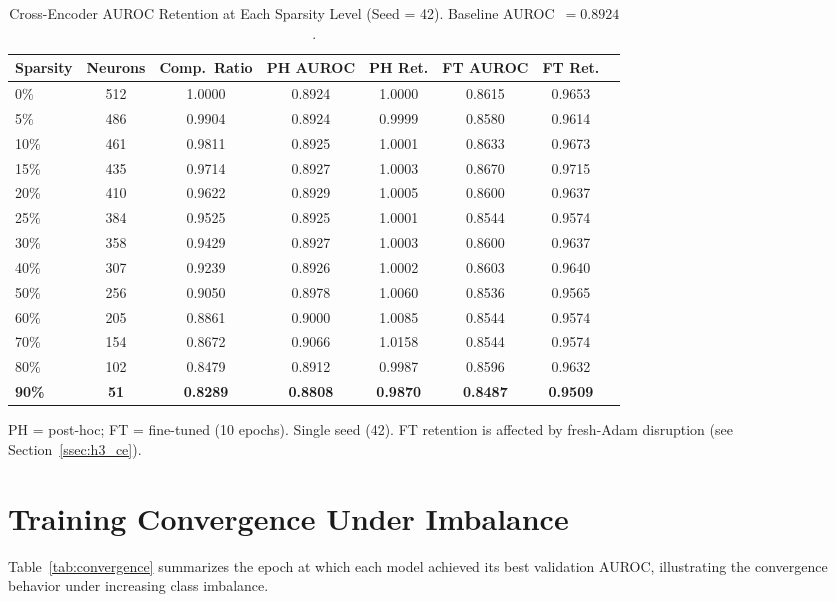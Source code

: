 \documentclass[journal]{IEEEtran}
\begin{document}
\begin{table}[!t]
  \caption{Cross-Encoder AUROC Retention at Each Sparsity Level (Seed = 42).
    Baseline AUROC~$= 0.8924$.}
  \label{tab:ce_pruning_full}
  \centering
  \small
  \begin{tabular}{lccccccc}
    \hline
    Sparsity & Neurons & Comp.\ Ratio & PH AUROC & PH Ret. & FT AUROC & FT Ret. \\
    \hline
    0\%           & 512 & 1.0000 & 0.8924 & 1.0000 & 0.8615 & 0.9653 \\
    5\%           & 486 & 0.9904 & 0.8924 & 0.9999 & 0.8580 & 0.9614 \\
    10\%          & 461 & 0.9811 & 0.8925 & 1.0001 & 0.8633 & 0.9673 \\
    15\%          & 435 & 0.9714 & 0.8927 & 1.0003 & 0.8670 & 0.9715 \\
    20\%          & 410 & 0.9622 & 0.8929 & 1.0005 & 0.8600 & 0.9637 \\
    25\%          & 384 & 0.9525 & 0.8925 & 1.0001 & 0.8544 & 0.9574 \\
    30\%          & 358 & 0.9429 & 0.8927 & 1.0003 & 0.8600 & 0.9637 \\
    40\%          & 307 & 0.9239 & 0.8926 & 1.0002 & 0.8603 & 0.9640 \\
    50\%          & 256 & 0.9050 & 0.8978 & 1.0060 & 0.8536 & 0.9565 \\
    60\%          & 205 & 0.8861 & 0.9000 & 1.0085 & 0.8544 & 0.9574 \\
    70\%          & 154 & 0.8672 & 0.9066 & 1.0158 & 0.8544 & 0.9574 \\
    80\%          & 102 & 0.8479 & 0.8912 & 0.9987 & 0.8596 & 0.9632 \\
    \textbf{90\%} & \textbf{51}  & \textbf{0.8289} & \textbf{0.8808} & \textbf{0.9870} & \textbf{0.8487} & \textbf{0.9509} \\
    \hline
  \end{tabular}
  \smallskip

  \noindent\small PH = post-hoc; FT = fine-tuned (10 epochs). Single seed (42).
  FT retention is affected by fresh-Adam disruption (see Section~\ref{ssec:h3_ce}).
\end{table}

\section{Training Convergence Under Imbalance}
\label{app:convergence}

Table~\ref{tab:convergence} summarizes the epoch at which each model achieved
its best validation AUROC, illustrating the convergence behavior under
increasing class imbalance.
\end{document}
